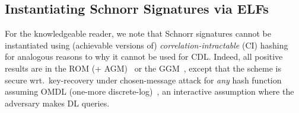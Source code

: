 

\subsection{Instantiating Schnorr Signatures via ELFs} 

 For the knowledgeable reader, we note that Schnorr signatures cannot be instantiated using (achievable versions of) \emph{correlation-intractable} (CI) hashing~\cite{JACM:CanGolHal04} for analogous reasons to why it cannot be used for CDL.
Indeed, all positive results  are in the  ROM (+ AGM)~\cite{JC:PoiSte00,EC:AABN02,EC:FucPloSeu20,INDOCRYPT:BelDai20,C:RotSeg21} or the GGM~\cite{JMC:NevSmaWar09,C:CLMQ21,EC:BloLee22,EPRINT:Shoup23},  except  that the scheme is secure wrt.~key-recovery under chosen-message attack  for \emph{any} hash function assuming OMDL (one-more discrete-log)~\cite{AC:PaiVer05}, an interactive assumption where the adversary makes DL queries. 


